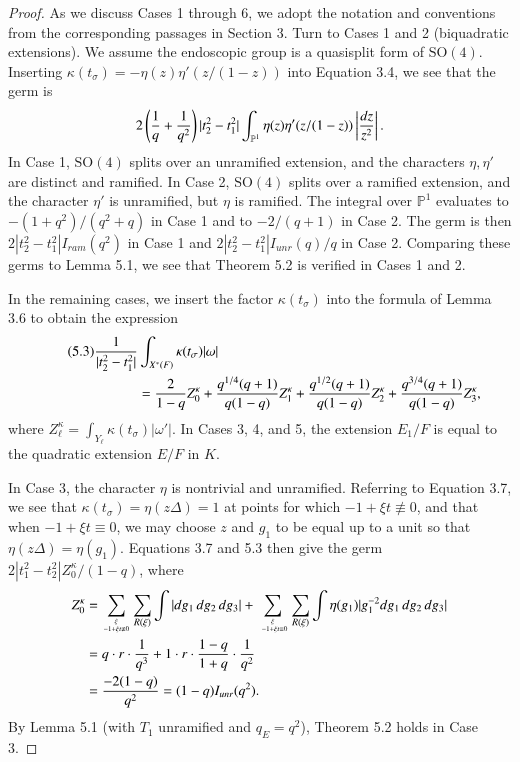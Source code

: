 \documentclass{amsart}
\newcommand\bP{{\mathbb P}}
\begin{document}
\begin{proof}
As we discuss Cases 1 through 6, we adopt the notation and
conventions from the corresponding passages in Section 3.
Turn to Cases 1 and 2 (biquadratic extensions).  
We assume the endoscopic group is
a quasisplit form of $\text{SO}(4)$.  Inserting $\kappa(t_\sigma)
= -\eta(z)\eta'(z/(1-z))$ into Equation 3.4, we see that
the germ is
$$2\left({1\over q} +{1\over q^2}\right) |t_2^2-t_1^2|
\int_{\bP^1} \eta(z)\eta'(z/(1-z)) \left| {dz\over z^2}\right |.$$
In Case 1, $\text{SO}(4)$ splits over an unramified extension, and
the characters $\eta,\eta'$ are distinct and ramified.
In Case 2, $\text{SO}(4)$ splits over a ramified extension, and
the character $\eta'$ is unramified, but $\eta$ is ramified.
The integral over $\bP^1$ evaluates to $-(1+q^2)/(q^2+q)$ in 
Case 1 and to $-2/(q+1)$ in Case 2.  The germ is
then $2|t_2^2-t_1^2|I_{ram}(q^2)$ in Case 1 and
$2|t_2^2-t_1^2|I_{unr}(q)/q$ in Case 2.
Comparing these germs
to Lemma 5.1, we see that Theorem 5.2 is verified
in Cases 1 and 2.

In the remaining cases, we insert the factor $\kappa(t_\sigma)$
into the formula of Lemma 3.6 to obtain the expression
\begin{align*}\tag{5.3}
{1\over |t_2^2-t_1^2|} &\int_{X^*(F)}\kappa(t_\sigma)|\omega| \\
 &=
{2\over 1-q} Z^\kappa_0 + {q^{1/4} (q+1)\over q (1-q)} Z^\kappa_1 +
{q^{1/2} (q+1)\over q (1-q)} Z^\kappa_2 + {q^{3/4} (q+1)\over q (1-q)}
Z^\kappa_3,
\end{align*}
where $Z_\ell^\kappa = \int_{Y_\ell}\kappa(t_\sigma) |\omega'|$.
In Cases 3, 4, and 5, the extension $E_1/F$ is equal to the
quadratic extension $E/F$ in $K$.


 In Case 3, 
the character $\eta$ is nontrivial and unramified.
Referring to Equation 3.7, we see that $\kappa(t_\sigma)
=\eta(z\Delta)=1$ at points for which $-1+\xi t \not\equiv 0$,
and that when $ -1+\xi t \equiv 0$, we may choose $z$ and
$g_1$ to be equal up to a unit so that $\eta(z\Delta)=\eta(g_1)$.
Equations 3.7 and 5.3 then give the germ $2|t_1^2-t_2^2| Z_0^\kappa/(1-q)$, where
\begin{align*}
Z_0^\kappa &=
  \sum_{\xi\atop -1+ \xi t\not\equiv 0}
  \sum_{R(\xi)}
  \int |dg_1\,dg_2\,dg_3| +
  \sum_{\xi\atop\ -1+ \xi t\equiv 0}
  \sum_{R(\xi)}
  \int \eta(g_1)|g_1^{-2}dg_1\,dg_2\,dg_3|\\
  &= 
q\cdot r\cdot {1\over q^3} + 1\cdot r\cdot {1-q\over 1+q}
      \cdot {1\over q^2}\\
  &= {-2(1-q)\over q^2} = (1-q) I_{unr}(q^2).
\end{align*}
By Lemma 5.1 (with $T_1$ unramified and $q_E=q^2$), 
Theorem 5.2 holds in Case 3.


\end{proof}
\end{document}
